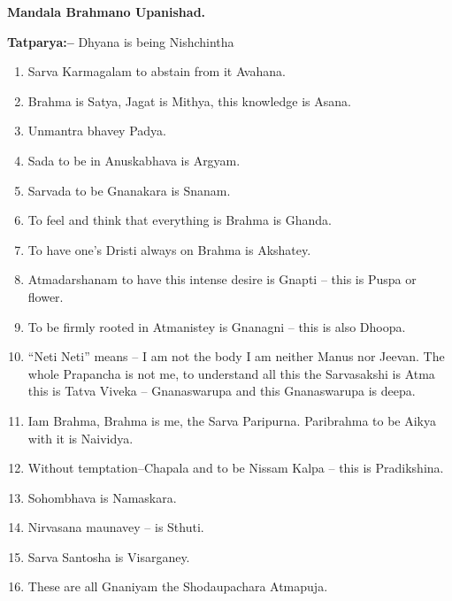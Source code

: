 \begin{flushright}
\textbf{Mandala Brahmano Upanishad.}
\end{flushright}

\textbf{Tatparya:–} Dhyana is being Nishchintha

\begin{enumerate}
\item Sarva Karmagalam to abstain from it Avahana.

 \item Brahma is Satya, Jagat is Mithya, this knowledge is Asana.

 \item Unmantra bhavey Padya.

 \item Sada to be in Anuskabhava is Argyam.

 \item Sarvada to be Gnanakara is Snanam.

 \item To feel and think that everything is Brahma is Ghanda.

 \item To have one's Dristi always on Brahma is Akshatey.

 \item Atmadarshanam to have this intense desire is Gnapti – this is Puspa or flower.

 \item To be firmly rooted in Atmanistey is Gnanagni – this is also Dhoopa.

 \item “Neti Neti” means – I am not the body I am neither Manus nor Jeevan. The whole Prapancha is not me, to understand all this the Sarvasakshi is Atma this is Tatva Viveka – Gnanaswarupa and this Gnanaswarupa is deepa.

 \item Iam Brahma, Brahma is me, the Sarva Paripurna. Paribrahma to be Aikya with it is Naividya.

 \item Without temptation–Chapala and to be Nissam Kalpa – this is Pradikshina.

 \item Sohombhava is Namaskara.

 \item Nirvasana maunavey – is Sthuti.

 \item Sarva Santosha is Visarganey.

 \item These are all Gnaniyam the Shodaupachara Atmapuja.

\end{enumerate}

